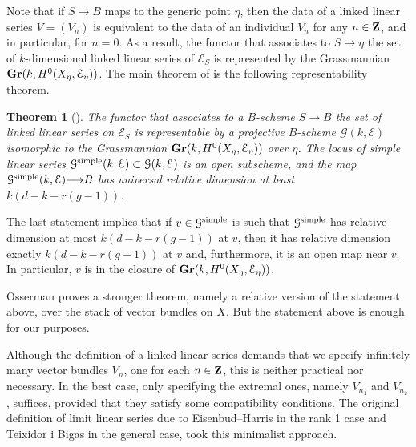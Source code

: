\documentclass[11pt,reqno]{amsart}
\theoremstyle{plain}
\newtheorem{theorem}{Theorem}[section]
\theoremstyle{definition}
\theoremstyle{remark}
\numberwithin{equation}{section}
\renewcommand{\to}{{\longrightarrow}}
\numberwithin{equation}{section}
\begin{document}
Note that if $S \to B$ maps to the generic point $\eta$, then the data of a linked linear series $V = (V_n)$ is equivalent to the data of an individual $V_n$ for any $n \in {\bf Z}$, and in particular, for $n = 0$.
As a result, the functor that associates to $S \to \eta$ the set of $k$-dimensional linked linear series of $\mathcal E_S$ is represented by the Grassmannian ${\bf Gr}(k, H^0(X_\eta, \mathcal E_\eta))$.
The main theorem of \cite{oss:14} is the following representability theorem.
\begin{theorem}[{\cite[Theorem~3.4.7]{oss:14}}]
  \label{thm:lls}
  The functor that associates to a $B$-scheme $S \to B$ the set of linked linear series on $\mathcal E_S$ is representable by a projective $B$-scheme $\mathcal G(k, \mathcal E)$ isomorphic to the Grassmannian ${\bf Gr}(k, H^0(X_\eta, \mathcal E_\eta))$ over $\eta$.
  The locus of simple linear series ${\mathcal G}^{\rm simple}(k, \mathcal E) \subset {\mathcal G}(k, \mathcal E)$ is an open subscheme, and the map ${\mathcal G}^{\rm simple}(k, \mathcal E) \to B$ has universal relative dimension at least $k(d-k-r(g-1))$.
\end{theorem}
The last statement implies that if $v \in {\mathcal G}^{\rm simple}$ is such that ${\mathcal G}^{\rm simple}$ has relative dimension at most $k(d-k-r(g-1))$ at $v$, then it has relative dimension exactly $k(d-k-r(g-1))$ at $v$ and, furthermore, it is an open map near $v$.
In particular, $v$ is in the closure of ${\bf Gr}(k, H^0(X_\eta, \mathcal E_\eta))$.
\begin{remark}
  Osserman proves a stronger theorem, namely a relative version of the statement above, over the stack of vector bundles on $X$.
  But the statement above is enough for our purposes.  
\end{remark}

Although the definition of a linked linear series demands that we specify infinitely many vector bundles $V_n$, one for each $n \in {\bf Z}$, this is neither practical nor necessary.
In the best case, only specifying the extremal ones, namely $V_{n_1}$ and $V_{n_2}$, suffices, provided that they satisfy some compatibility conditions.
The original definition of limit linear series due to Eisenbud--Harris \cite{eis.har:86,eis.har:84} in the rank 1 case and Teixidor i Bigas \cite{tei-i-big:91} in the general case, took this minimalist approach.
\end{document}
